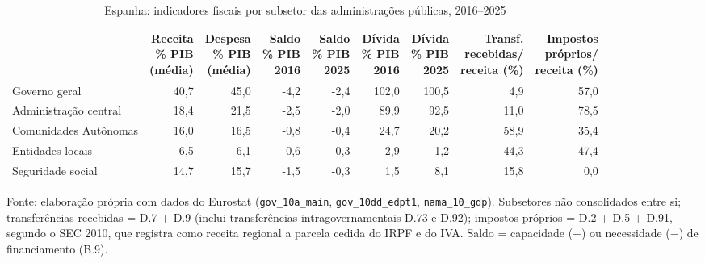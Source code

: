 \begin{table}[htbp]
\centering
\caption{Espanha: indicadores fiscais por subsetor das administrações públicas, 2016--2025}
\label{tab:espanha}
\scriptsize
\begin{tabular}{lrrrrrrrr}
\toprule
 & \makecell{Receita\\\% PIB\\(média)} & \makecell{Despesa\\\% PIB\\(média)} & \makecell{Saldo\\\% PIB\\2016} & \makecell{Saldo\\\% PIB\\2025} & \makecell{Dívida\\\% PIB\\2016} & \makecell{Dívida\\\% PIB\\2025} & \makecell{Transf.\\recebidas/\\receita (\%)} & \makecell{Impostos\\próprios/\\receita (\%)}\\
\midrule
Governo geral & 40,7 & 45,0 & -4,2 & -2,4 & 102,0 & 100,5 & 4,9 & 57,0\\
Administração central & 18,4 & 21,5 & -2,5 & -2,0 & 89,9 & 92,5 & 11,0 & 78,5\\
Comunidades Autônomas & 16,0 & 16,5 & -0,8 & -0,4 & 24,7 & 20,2 & 58,9 & 35,4\\
Entidades locais & 6,5 & 6,1 & 0,6 & 0,3 & 2,9 & 1,2 & 44,3 & 47,4\\
Seguridade social & 14,7 & 15,7 & -1,5 & -0,3 & 1,5 & 8,1 & 15,8 & 0,0\\
\bottomrule
\end{tabular}
\par\smallskip
\begin{minipage}{0.97\textwidth}\scriptsize
Fonte: elaboração própria com dados do Eurostat (\texttt{gov\_10a\_main}, \texttt{gov\_10dd\_edpt1}, \texttt{nama\_10\_gdp}). Subsetores não consolidados entre si; transferências recebidas = D.7 + D.9 (inclui transferências intragovernamentais D.73 e D.92); impostos próprios = D.2 + D.5 + D.91, segundo o SEC 2010, que registra como receita regional a parcela cedida do IRPF e do IVA. Saldo = capacidade (+) ou necessidade ($-$) de financiamento (B.9).
\end{minipage}
\end{table}

